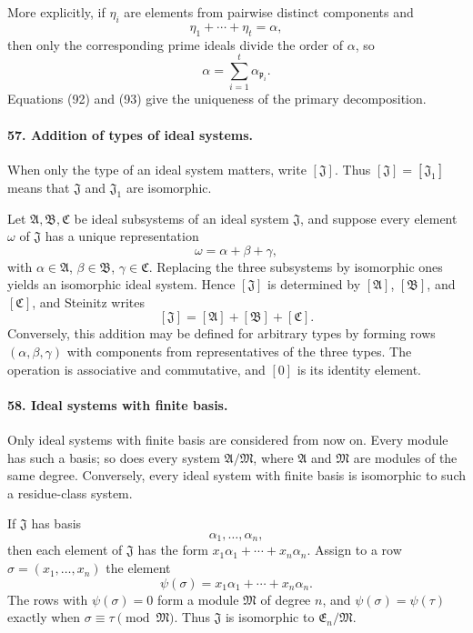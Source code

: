 \documentclass[11pt]{article}
\begin{document}
More explicitly, if $\eta_i$ are elements from pairwise distinct components and
\begin{equation}
  \eta_1+\cdots+\eta_t=\alpha,
\tag{92}
\end{equation}
then only the corresponding prime ideals divide the order of $\alpha$, so
\begin{equation}
  \alpha=\sum_{i=1}^{t}\alpha_{\mathfrak p_i}.
\tag{93}
\end{equation}
Equations (92) and (93) give the uniqueness of the primary decomposition.

\paragraph{57. Addition of types of ideal systems.}
When only the type of an ideal system matters, write $[\mathfrak J]$. Thus $[\mathfrak J]=[\mathfrak J_1]$ means that $\mathfrak J$ and $\mathfrak J_1$ are isomorphic.

Let $\mathfrak A,\mathfrak B,\mathfrak C$ be ideal subsystems of an ideal system $\mathfrak J$, and suppose every element $\omega$ of $\mathfrak J$ has a unique representation
\begin{equation}
  \omega=\alpha+\beta+\gamma,
\tag{94}
\end{equation}
with $\alpha\in\mathfrak A$, $\beta\in\mathfrak B$, $\gamma\in\mathfrak C$. Replacing the three subsystems by isomorphic ones yields an isomorphic ideal system. Hence $[\mathfrak J]$ is determined by $[\mathfrak A]$, $[\mathfrak B]$, and $[\mathfrak C]$, and Steinitz writes
\[
  [\mathfrak J]=[\mathfrak A]+[\mathfrak B]+[\mathfrak C].
\]
Conversely, this addition may be defined for arbitrary types by forming rows $(\alpha,\beta,\gamma)$ with components from representatives of the three types. The operation is associative and commutative, and $[0]$ is its identity element.

\paragraph{58. Ideal systems with finite basis.}
Only ideal systems with finite basis are considered from now on. Every module has such a basis; so does every system $\mathfrak A/\mathfrak M$, where $\mathfrak A$ and $\mathfrak M$ are modules of the same degree. Conversely, every ideal system with finite basis is isomorphic to such a residue-class system.

If $\mathfrak J$ has basis
\begin{equation}
  \alpha_1,\ldots,\alpha_n,
\tag{95}
\end{equation}
then each element of $\mathfrak J$ has the form $x_1\alpha_1+\cdots+x_n\alpha_n$. Assign to a row $\sigma=(x_1,
\ldots,x_n)$ the element
\[
  \psi(\sigma)=x_1\alpha_1+\cdots+x_n\alpha_n.
\]
The rows with $\psi(\sigma)=0$ form a module $\mathfrak M$ of degree $n$, and $\psi(\sigma)=\psi(\tau)$ exactly when $\sigma\equiv\tau\pmod{\mathfrak M}$. Thus $\mathfrak J$ is isomorphic to $\mathfrak E_n/\mathfrak M$.
\end{document}
